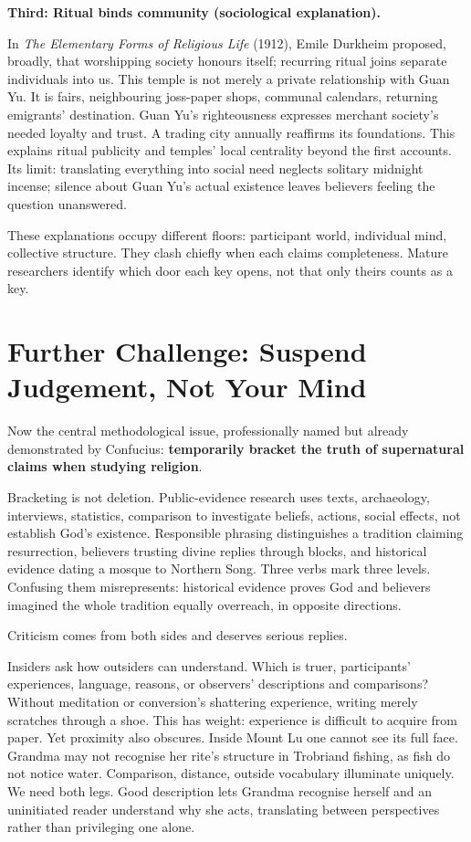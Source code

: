 \textbf{Third: Ritual binds community (sociological explanation).}

In \textit{The Elementary Forms of Religious Life} (1912), Emile Durkheim proposed, broadly, that worshipping society honours itself; recurring ritual joins separate individuals into us. This temple is not merely a private relationship with Guan Yu. It is fairs, neighbouring joss-paper shops, communal calendars, returning emigrants' destination. Guan Yu's righteousness expresses merchant society's needed loyalty and trust. A trading city annually reaffirms its foundations. This explains ritual publicity and temples' local centrality beyond the first accounts. Its limit: translating everything into social need neglects solitary midnight incense; silence about Guan Yu's actual existence leaves believers feeling the question unanswered.

These explanations occupy different floors: participant world, individual mind, collective structure. They clash chiefly when each claims completeness. Mature researchers identify which door each key opens, not that only theirs counts as a key.

\section[Further Challenge: Suspend Judgement]{Further Challenge: Suspend Judgement, Not Your Mind}
Now the central methodological issue, professionally named but already demonstrated by Confucius: \textbf{temporarily bracket the truth of supernatural claims when studying religion}.

Bracketing is not deletion. Public-evidence research uses texts, archaeology, interviews, statistics, comparison to investigate beliefs, actions, social effects, not establish God's existence. Responsible phrasing distinguishes a tradition claiming resurrection, believers trusting divine replies through blocks, and historical evidence dating a mosque to Northern Song. Three verbs mark three levels. Confusing them misrepresents: historical evidence proves God and believers imagined the whole tradition equally overreach, in opposite directions.

Criticism comes from both sides and deserves serious replies.

Insiders ask how outsiders can understand. Which is truer, participants' experiences, language, reasons, or observers' descriptions and comparisons? Without meditation or conversion's shattering experience, writing merely scratches through a shoe. This has weight: experience is difficult to acquire from paper. Yet proximity also obscures. Inside Mount Lu one cannot see its full face. Grandma may not recognise her rite's structure in Trobriand fishing, as fish do not notice water. Comparison, distance, outside vocabulary illuminate uniquely. We need both legs. Good description lets Grandma recognise herself and an uninitiated reader understand why she acts, translating between perspectives rather than privileging one alone.

